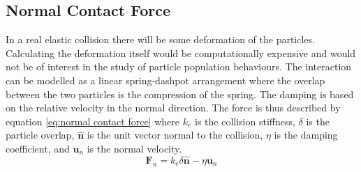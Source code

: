 \documentclass[10pt,a4paper,titlepage]{report}
\begin{document}
\subsection{Normal Contact Force}
In a real elastic collision there will be some deformation of the particles. Calculating the deformation itself would be computationally expensive and would not be of interest in the study of particle population behaviours. The interaction can be modelled as a linear spring-dashpot arrangement where the overlap between the two particles is the compression of the spring. The damping is based on the relative velocity in the normal direction. The force is thus described by equation \ref{eq:normal contact force} where $k_{e}$ is the collision stiffness, $\delta$ is the particle overlap, $\mathbf{\hat{n}}$ is the unit vector normal to the collision, $\eta$ is the damping coefficient, and $\mathbf{u}_{n}$ is the normal velocity.%
\begin{equation}
\mathbf{F}_{n} = k_{e} \delta \mathbf{\hat{n}} - \eta \mathbf{u}_{n}
\label{eq:normal contact force}
\end{equation}
\end{document}
